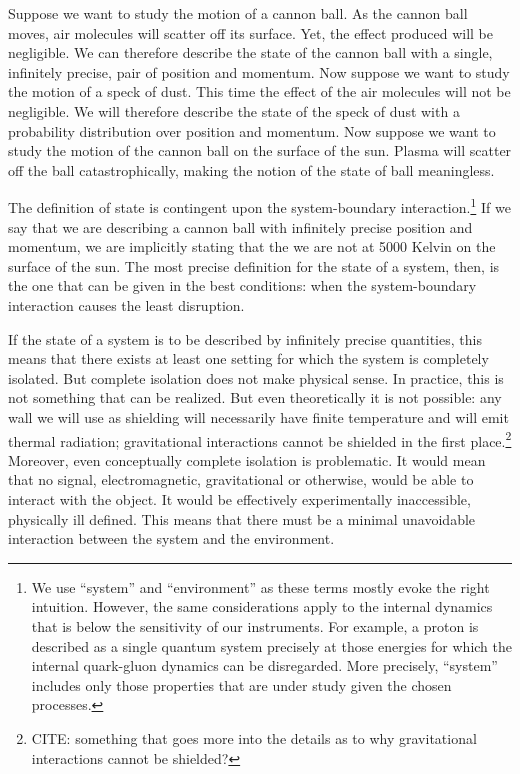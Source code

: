 \documentclass[10pt,twocolumn, nofootinbib]{revtex4-2}
\begin{document}
Suppose we want to study the motion of a cannon ball. As the cannon ball moves, air molecules will scatter off its surface. Yet, the effect produced will be negligible. We can therefore describe the state of the cannon ball with a single, infinitely precise, pair of position and momentum. Now suppose we want to study the motion of a speck of dust. This time the effect of the air molecules will not be negligible. We will therefore describe the state of the speck of dust with a probability distribution over position and momentum. Now suppose we want to study the motion of the cannon ball on the surface of the sun. Plasma will scatter off the ball catastrophically, making the notion of the state of ball meaningless.

The definition of state is contingent upon the system-boundary interaction.\footnote{We use ``system'' and ``environment'' as these terms mostly evoke the right intuition. However, the same considerations apply to the internal dynamics that is below the sensitivity of our instruments. For example, a proton is described as a single quantum system precisely at those energies for which the internal quark-gluon dynamics can be disregarded. More precisely, ``system'' includes only those properties that are under study given the chosen processes.} If we say that we are describing a cannon ball with infinitely precise position and momentum, we are implicitly stating that the we are not at 5000 Kelvin on the surface of the sun. The most precise definition for the state of a system, then, is the one that can be given in the best conditions: when the system-boundary interaction causes the least disruption.

If the state of a system is to be described by infinitely precise quantities, this means that there exists at least one setting for which the system is completely isolated. But complete isolation does not make physical sense. In practice, this is not something that can be realized. But even theoretically it is not possible: any wall we will use as shielding will necessarily have finite temperature and will emit thermal radiation; gravitational interactions cannot be shielded in the first place.\footnote{CITE: something that goes more into the details as to why gravitational interactions cannot be shielded?} Moreover, even conceptually complete isolation is problematic. It would mean that no signal, electromagnetic, gravitational or otherwise, would be able to interact with the object. It would be effectively experimentally inaccessible, physically ill defined. This means that there must be a minimal unavoidable interaction between the system and the environment.
\end{document}
